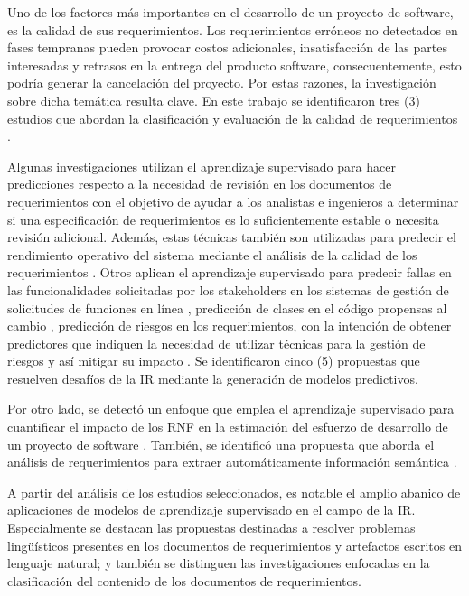 \documentclass[journal]{IEEEtran}
\begin{document}
Uno de los factores más importantes en el desarrollo de un proyecto de software, es la calidad de sus requerimientos. Los requerimientos erróneos no detectados en fases tempranas pueden provocar costos adicionales, insatisfacción de las partes interesadas y retrasos en la entrega del producto software, consecuentemente, esto podría generar la cancelación del proyecto. Por estas razones, la investigación sobre dicha temática resulta clave. En este trabajo se identificaron tres (3) estudios que abordan la clasificación y evaluación de la calidad de requerimientos \cite{Parra2015180,Hayes2015,Hussain2007}. 

Algunas investigaciones utilizan el aprendizaje supervisado para hacer predicciones respecto a la necesidad de revisión en los documentos de requerimientos \cite{del2017stability} con el objetivo de ayudar a los analistas e ingenieros a determinar si una especificación de requerimientos es lo suficientemente estable o necesita revisión adicional. Además, estas técnicas también son utilizadas para predecir el rendimiento operativo del sistema mediante el análisis de la calidad de los requerimientos \cite{dargan2016systems}. Otros aplican el aprendizaje supervisado para predecir fallas en las funcionalidades solicitadas por los stakeholders en los sistemas de gestión de solicitudes de funciones en línea \cite{fitzgerald2012early}, predicción de clases en el código propensas al cambio \cite{malhotra2017exploratory}, predicción de riesgos en los requerimientos, con la intención de obtener predictores que indiquen la necesidad de utilizar técnicas para la gestión de riesgos y así mitigar su impacto \cite{del2011requirement}. Se identificaron cinco (5) propuestas que resuelven desafíos de la IR mediante la generación de modelos predictivos. 

Por otro lado, se detectó un enfoque que emplea el aprendizaje supervisado para cuantificar el impacto de los RNF en la estimación del esfuerzo de desarrollo de un proyecto de software \cite{Abdukalykov2011158}. También, se identificó una propuesta que aborda el análisis de requerimientos para extraer automáticamente información semántica \cite{Wang2016}. 

A partir del análisis de los estudios seleccionados, es notable el amplio abanico de aplicaciones de modelos de aprendizaje supervisado en el campo de la IR. Especialmente se destacan las propuestas destinadas a resolver problemas lingüísticos presentes en los documentos de requerimientos y artefactos escritos en lenguaje natural; y también se distinguen las investigaciones enfocadas en la clasificación del contenido de los documentos de requerimientos.
\end{document}

